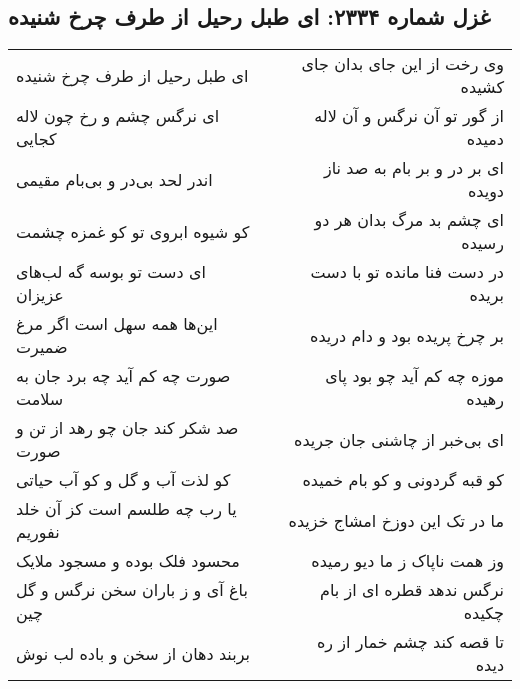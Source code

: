 \begin{center}
\section*{غزل شماره ۲۳۳۴: ای طبل رحیل از طرف چرخ شنیده}
\label{sec:2334}
\begin{longtable}{l p{0.5cm} r}
ای طبل رحیل از طرف چرخ شنیده
&&
وی رخت از این جای بدان جای کشیده
\\
ای نرگس چشم و رخ چون لاله کجایی
&&
از گور تو آن نرگس و آن لاله دمیده
\\
اندر لحد بی‌در و بی‌بام مقیمی
&&
ای بر در و بر بام به صد ناز دویده
\\
کو شیوه ابروی تو کو غمزه چشمت
&&
ای چشم بد مرگ بدان هر دو رسیده
\\
ای دست تو بوسه گه لب‌های عزیزان
&&
در دست فنا مانده تو با دست بریده
\\
این‌ها همه سهل است اگر مرغ ضمیرت
&&
بر چرخ پریده بود و دام دریده
\\
صورت چه کم آید چه برد جان به سلامت
&&
موزه چه کم آید چو بود پای رهیده
\\
صد شکر کند جان چو رهد از تن و صورت
&&
ای بی‌خبر از چاشنی جان جریده
\\
کو لذت آب و گل و کو آب حیاتی
&&
کو قبه گردونی و کو بام خمیده
\\
یا رب چه طلسم است کز آن خلد نفوریم
&&
ما در تک این دوزخ امشاج خزیده
\\
محسود فلک بوده و مسجود ملایک
&&
وز همت ناپاک ز ما دیو رمیده
\\
باغ آی و ز باران سخن نرگس و گل چین
&&
نرگس ندهد قطره ای از بام چکیده
\\
بربند دهان از سخن و باده لب نوش
&&
تا قصه کند چشم خمار از ره دیده
\\
\end{longtable}
\end{center}
